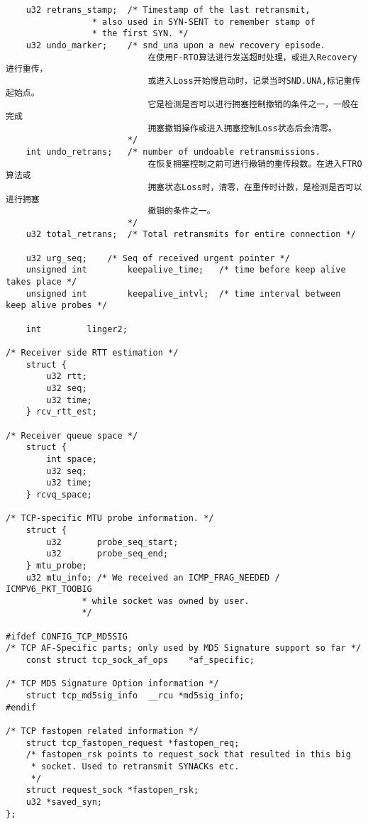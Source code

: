 \begin{verbatim}
    u32 retrans_stamp;  /* Timestamp of the last retransmit,
                 * also used in SYN-SENT to remember stamp of
                 * the first SYN. */
    u32 undo_marker;    /* snd_una upon a new recovery episode. 
                            在使用F-RTO算法进行发送超时处理，或进入Recovery进行重传，
                            或进入Loss开始慢启动时，记录当时SND.UNA,标记重传起始点。
                            它是检测是否可以进行拥塞控制撤销的条件之一，一般在完成
                            拥塞撤销操作或进入拥塞控制Loss状态后会清零。
                        */
    int undo_retrans;   /* number of undoable retransmissions. 
                            在恢复拥塞控制之前可进行撤销的重传段数。在进入FTRO算法或
                            拥塞状态Loss时，清零，在重传时计数，是检测是否可以进行拥塞
                            撤销的条件之一。
                        */
    u32 total_retrans;  /* Total retransmits for entire connection */

    u32 urg_seq;    /* Seq of received urgent pointer */
    unsigned int        keepalive_time;   /* time before keep alive takes place */
    unsigned int        keepalive_intvl;  /* time interval between keep alive probes */

    int         linger2;

/* Receiver side RTT estimation */
    struct {
        u32 rtt;
        u32 seq;
        u32 time;
    } rcv_rtt_est;

/* Receiver queue space */
    struct {
        int space;
        u32 seq;
        u32 time;
    } rcvq_space;

/* TCP-specific MTU probe information. */
    struct {
        u32       probe_seq_start;
        u32       probe_seq_end;
    } mtu_probe;
    u32 mtu_info; /* We received an ICMP_FRAG_NEEDED / ICMPV6_PKT_TOOBIG
               * while socket was owned by user.
               */

#ifdef CONFIG_TCP_MD5SIG
/* TCP AF-Specific parts; only used by MD5 Signature support so far */
    const struct tcp_sock_af_ops    *af_specific;

/* TCP MD5 Signature Option information */
    struct tcp_md5sig_info  __rcu *md5sig_info;
#endif

/* TCP fastopen related information */
    struct tcp_fastopen_request *fastopen_req;
    /* fastopen_rsk points to request_sock that resulted in this big
     * socket. Used to retransmit SYNACKs etc.
     */
    struct request_sock *fastopen_rsk;
    u32 *saved_syn;
};
\end{verbatim}
